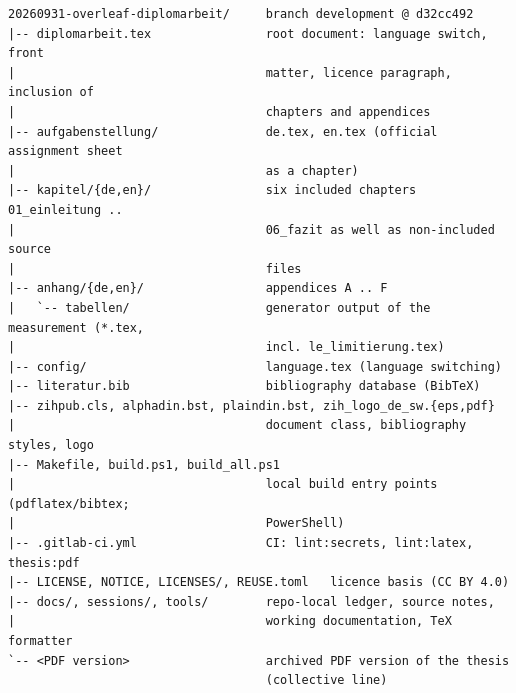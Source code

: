 {\footnotesize
\begin{verbatim}
20260931-overleaf-diplomarbeit/     branch development @ d32cc492
|-- diplomarbeit.tex                root document: language switch, front
|                                   matter, licence paragraph, inclusion of
|                                   chapters and appendices
|-- aufgabenstellung/               de.tex, en.tex (official assignment sheet
|                                   as a chapter)
|-- kapitel/{de,en}/                six included chapters 01_einleitung ..
|                                   06_fazit as well as non-included source
|                                   files
|-- anhang/{de,en}/                 appendices A .. F
|   `-- tabellen/                   generator output of the measurement (*.tex,
|                                   incl. le_limitierung.tex)
|-- config/                         language.tex (language switching)
|-- literatur.bib                   bibliography database (BibTeX)
|-- zihpub.cls, alphadin.bst, plaindin.bst, zih_logo_de_sw.{eps,pdf}
|                                   document class, bibliography styles, logo
|-- Makefile, build.ps1, build_all.ps1
|                                   local build entry points (pdflatex/bibtex;
|                                   PowerShell)
|-- .gitlab-ci.yml                  CI: lint:secrets, lint:latex, thesis:pdf
|-- LICENSE, NOTICE, LICENSES/, REUSE.toml   licence basis (CC BY 4.0)
|-- docs/, sessions/, tools/        repo-local ledger, source notes,
|                                   working documentation, TeX formatter
`-- <PDF version>                   archived PDF version of the thesis
                                    (collective line)
\end{verbatim}
}

